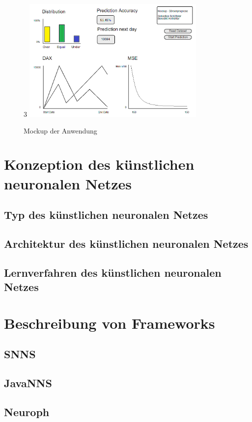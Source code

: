 \documentclass[a4paper,DIV11,bibliography=totoc,headings=normal,ngerman,headsepline,listof=totoc,parskip=half]{scrreprt}
\begin{document}
\begin{figure}[htbp]3
\centering
		\includegraphics[width=0.80\textwidth]{mockup.PNG}
	\caption{Mockup der Anwendung}
	\label{fig:Mockup der Anwendung}
\end{figure}


\section{Konzeption des künstlichen neuronalen Netzes} %
\subsection{Typ des künstlichen neuronalen Netzes} %
\subsection{Architektur des künstlichen neuronalen Netzes} %
\subsection{Lernverfahren des künstlichen neuronalen Netzes} %
\section{Beschreibung von Frameworks} %
\subsection{SNNS} %
\subsection{JavaNNS}  %
\subsection{Neuroph} %
\end{document}
